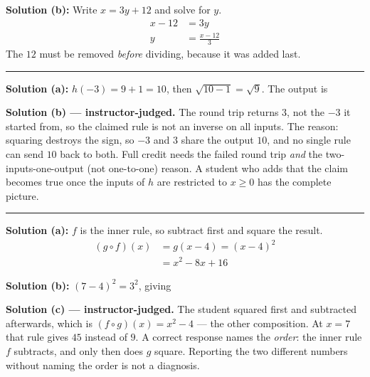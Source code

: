 \documentclass[12pt]{article}
\begin{document}
\textbf{Solution (b):} Write $x = 3y + 12$ and solve for $y$.
\begin{align*}
  x - 12 &= 3y \\
  y &= \frac{x - 12}{3}
\end{align*}
The $12$ must be removed \emph{before} dividing, because it was added last. 

\vspace{0.2cm}\noindent\rule{\linewidth}{0.2pt}


\textbf{Solution (a):} $h(-3) = 9 + 1 = 10$, then $\sqrt{10 - 1} = \sqrt{9}$. The output is

\vspace{0.15cm}
\textbf{Solution (b) --- instructor-judged.} The round trip returns $3$, not the $-3$ it
started from, so the claimed rule is not an inverse on all inputs. The reason: squaring
destroys the sign, so $-3$ and $3$ share the output $10$, and no single rule can send $10$
back to both. Full credit needs the failed round trip \emph{and} the two-inputs-one-output
(not one-to-one) reason. A student who adds that the claim becomes true once the inputs of
$h$ are restricted to $x \ge 0$ has the complete picture.

\vspace{0.2cm}\noindent\rule{\linewidth}{0.2pt}


\textbf{Solution (a):} $f$ is the inner rule, so subtract first and square the result.
\begin{align*}
  (g \circ f)(x) &= g(x - 4) = (x - 4)^2 \\
                 &= x^2 - 8x + 16
\end{align*}

\textbf{Solution (b):} $(7 - 4)^2 = 3^2$, giving 

\vspace{0.15cm}
\textbf{Solution (c) --- instructor-judged.} The student squared first and subtracted
afterwards, which is $(f \circ g)(x) = x^2 - 4$ --- the other composition. At $x = 7$ that
rule gives $45$ instead of $9$. A correct response names the \emph{order}: the inner rule
$f$ subtracts, and only then does $g$ square. Reporting the two different numbers without
naming the order is not a diagnosis.
\end{document}
